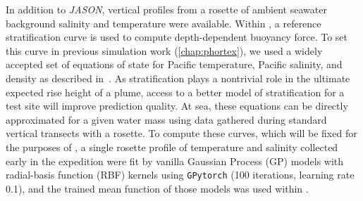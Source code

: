 In addition to \emph{JASON}, vertical profiles from a rosette of ambient seawater background salinity and temperature were available. Within \PHUMES, a reference stratification curve is used to compute depth-dependent buoyancy force. To set this curve in previous simulation work (\cref{chap:phortex}), we used a widely accepted set of equations of state for Pacific temperature, Pacific salinity, and density as described in~\cite{speer1987model}. As stratification plays a nontrivial role in the ultimate expected rise height of a plume, access to a better model of stratification for a test site will improve prediction quality. At sea, these equations can be directly approximated for a given water mass using data gathered during standard vertical transects with a rosette. To compute these curves, which will be fixed for the purposes of \PHUMES, a single rosette profile of temperature and salinity collected early in the expedition were fit by vanilla Gaussian Process (GP) models with radial-basis function (RBF) kernels using \verb|GPytorch| (100 iterations, learning rate 0.1), and the trained mean function of those models was used within \PHUMES.


